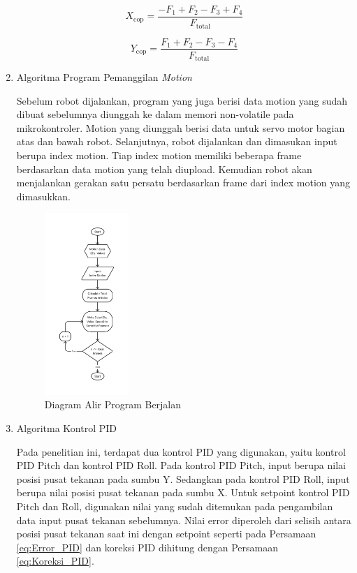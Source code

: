 \begin{enumerate}[label=\Alph*.]
    \begin{equation}
      X_{\mathrm{cop}} = \frac{- F_1 + F_2 - F_3 + F_4}{F_{\mathrm{total}}}
      \label{eq:COP_X}
    \end{equation}

    \begin{equation}
      Y_{\mathrm{cop}} = \frac{F_1 + F_2 - F_3 - F_4}{F_{\mathrm{total}}}
      \label{eq:COP_Y}
    \end{equation}

    \item Algoritma Program Pemanggilan \textit{Motion}
    \label{subsec:algoritmamotion}

    \hspace*{1em} Sebelum robot dijalankan, program yang juga berisi data motion yang sudah dibuat sebelumnya diunggah ke dalam memori non-volatile pada  mikrokontroler. Motion yang diunggah berisi data untuk servo motor bagian atas dan bawah robot. Selanjutnya, robot dijalankan dan dimasukan input berupa index motion. Tiap index motion memiliki beberapa frame berdasarkan data motion yang telah diupload. Kemudian robot akan menjalankan gerakan satu persatu berdasarkan frame dari index motion yang dimasukkan.

    \begin{figure} [h]
      \centering
      \includegraphics[width=0.3\textwidth]{gambar/flowchart_play_index.png}
      \caption{Diagram Alir Program Berjalan}
      \label{fig:Algoritma_Berjalan}
    \end{figure}

    \item Algoritma Kontrol PID
    \label{subsec:algoritmakontrolpid}

    \hspace*{1em} Pada penelitian ini, terdapat dua kontrol PID yang digunakan, yaitu kontrol PID Pitch dan kontrol PID Roll. Pada kontrol PID Pitch, input berupa nilai posisi pusat tekanan pada sumbu Y. Sedangkan pada kontrol PID Roll, input berupa nilai posisi pusat tekanan pada sumbu X. Untuk setpoint kontrol PID Pitch dan Roll, digunakan nilai yang sudah ditemukan pada pengambilan data input pusat tekanan sebelumnya. Nilai error diperoleh dari selisih antara posisi pusat tekanan saat ini dengan setpoint seperti pada Persamaan \ref{eq:Error_PID} dan koreksi PID dihitung dengan Persamaan \ref{eq:Koreksi_PID}.


\end{enumerate}
